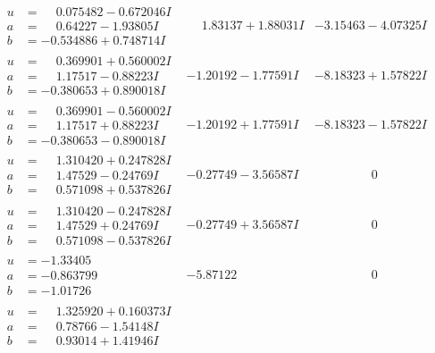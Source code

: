 \documentclass[1p]{elsarticle_modified}
\theoremstyle{definition}
\begin{document}
$$\begin{array}{c|c|c}
\begin{aligned}
u &= \phantom{-}0.075482 - 0.672046 I \\
a &= \phantom{-}0.64227 - 1.93805 I \\
b &= -0.534886 + 0.748714 I\end{aligned}
 & \phantom{-}1.83137 + 1.88031 I & -3.15463 - 4.07325 I \\ \hline\begin{aligned}
u &= \phantom{-}0.369901 + 0.560002 I \\
a &= \phantom{-}1.17517 - 0.88223 I \\
b &= -0.380653 + 0.890018 I\end{aligned}
 & -1.20192 - 1.77591 I & -8.18323 + 1.57822 I \\ \hline\begin{aligned}
u &= \phantom{-}0.369901 - 0.560002 I \\
a &= \phantom{-}1.17517 + 0.88223 I \\
b &= -0.380653 - 0.890018 I\end{aligned}
 & -1.20192 + 1.77591 I & -8.18323 - 1.57822 I \\ \hline\begin{aligned}
u &= \phantom{-}1.310420 + 0.247828 I \\
a &= \phantom{-}1.47529 - 0.24769 I \\
b &= \phantom{-}0.571098 + 0.537826 I\end{aligned}
 & -0.27749 - 3.56587 I & \phantom{-0.000000 } 0 \\ \hline\begin{aligned}
u &= \phantom{-}1.310420 - 0.247828 I \\
a &= \phantom{-}1.47529 + 0.24769 I \\
b &= \phantom{-}0.571098 - 0.537826 I\end{aligned}
 & -0.27749 + 3.56587 I & \phantom{-0.000000 } 0 \\ \hline\begin{aligned}
u &= -1.33405\phantom{ +0.000000I} \\
a &= -0.863799\phantom{ +0.000000I} \\
b &= -1.01726\phantom{ +0.000000I}\end{aligned}
 & -5.87122\phantom{ +0.000000I} & \phantom{-0.000000 } 0 \\ \hline\begin{aligned}
u &= \phantom{-}1.325920 + 0.160373 I \\
a &= \phantom{-}0.78766 - 1.54148 I \\
b &= \phantom{-}0.93014 + 1.41946 I\end{aligned}

\end{array}$$
\end{document}
